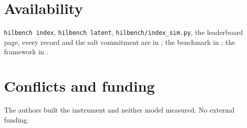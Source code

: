 \documentclass[11pt]{article}
\theoremstyle{definition}
\begin{document}
\section*{Availability}
\texttt{hilbench index}, \texttt{hilbench latent}, \texttt{hilbench/index\_sim.py}, the leaderboard page, every record and the salt commitment are in \citet{yang2026hilbench}; the benchmark in \citet{yang2026hilbenchpaper}; the framework in \citet{yang2026unified}.

\section*{Conflicts and funding}
The authors built the instrument and neither model measured. No external funding.



\end{document}
